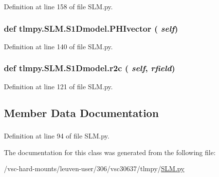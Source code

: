Definition at line 158 of file SLM.py.\hypertarget{classtlmpy_1_1SLM_1_1S1Dmodel_af1b46e1dcf1552fa493320490aec75f5}{
\subsubsection[{PHIvector}]{\setlength{\rightskip}{0pt plus 5cm}def tlmpy.SLM.S1Dmodel.PHIvector ( {\em self})}}
\label{classtlmpy_1_1SLM_1_1S1Dmodel_af1b46e1dcf1552fa493320490aec75f5}


Definition at line 140 of file SLM.py.\hypertarget{classtlmpy_1_1SLM_1_1S1Dmodel_a486ad9bfa2eb33220028e1bf0c04c7be}{
\subsubsection[{r2c}]{\setlength{\rightskip}{0pt plus 5cm}def tlmpy.SLM.S1Dmodel.r2c ( {\em self}, \/   {\em rfield})}}
\label{classtlmpy_1_1SLM_1_1S1Dmodel_a486ad9bfa2eb33220028e1bf0c04c7be}


Definition at line 121 of file SLM.py.

\subsection{Member Data Documentation}
\hypertarget{classtlmpy_1_1SLM_1_1S1Dmodel_a2e36c033ae3f07a87923d3c5cebab1cc}{
\subsubsection[{PHI}]{}}
\label{classtlmpy_1_1SLM_1_1S1Dmodel_a2e36c033ae3f07a87923d3c5cebab1cc}


Definition at line 94 of file SLM.py.

The documentation for this class was generated from the following file:\begin{DoxyCompactItemize}
\item 
/vsc-\/hard-\/mounts/leuven-\/user/306/vsc30637/tlmpy/\hyperlink{SLM_8py}{SLM.py}\end{DoxyCompactItemize}
